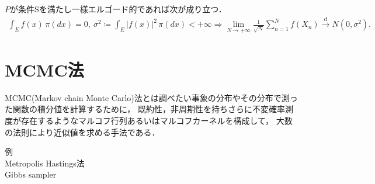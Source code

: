 	\begin{prp}[中心極限定理]
		$P$が条件Sを満たし一様エルゴード的であれば次が成り立つ．
		\begin{align}
			\int_E f(x)\, \pi(dx) = 0,\ \sigma^2 \coloneqq \int_E |f(x)|^2\, \pi(dx) < +\infty 
			\Rightarrow \lim_{N \to +\infty} \frac{1}{\sqrt{N}} \sum_{n=1}^{N} f(X_n) \overset{\mathrm{d}}{\rightarrow} N(0,\sigma^2).
		\end{align}
	\end{prp}
	
\section{MCMC法}
	MCMC(Markov chain Monte Carlo)法とは調べたい事象の分布やその分布で測った関数の積分値を計算するために，
	既約性，非周期性を持ちさらに不変確率測度が存在するようなマルコフ行列あるいはマルコフカーネルを構成して，
	大数の法則により近似値を求める手法である．
	
	\begin{description}
		\item[例]
		\item[Metropolis Hastings法]
		\item[Gibbs sampler]
	\end{description}
	